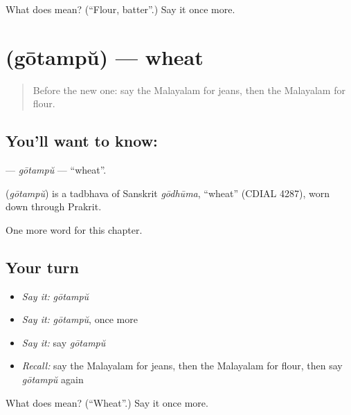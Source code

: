 \begin{tcolorbox}[breakable,colback=teal!4,colframe=teal!35!black,title={Before you move on}]
What does  mean? (\textquotedblleft{}Flour, batter\textquotedblright{}.) Say it once more.
\end{tcolorbox}
\section[\texorpdfstring{\ml{ഗോതമ്പ്} (gōtampŭ)}{ഗോതമ്പ് (gōtampŭ)}]{ (gōtampŭ) — wheat}

\label{lesson:ML-C249-gotambu}



\begin{quote}
Before the new one: say the Malayalam for jeans, then the Malayalam for flour.
\end{quote}

\subsection*{You'll want to know: }
\textbf{} — \emph{gōtampŭ} — \textquotedblleft{}wheat\textquotedblright{}.

\begin{cousinweb}
\textbf{} (\emph{gōtampŭ}) is a tadbhava of Sanskrit \emph{gōdhūma}, \textquotedblleft{}wheat\textquotedblright{} (CDIAL 4287), worn down through Prakrit.
\end{cousinweb}

\begin{grammarlens}[title={What you've built}]
One more word for this chapter.
\end{grammarlens}

\subsection*{Your turn}
\begin{itemize}
\raggedright
  \item \emph{Say it:} \emph{gōtampŭ}
  \item \emph{Say it:} \emph{gōtampŭ}, once more
  \item \emph{Say it:} say \emph{gōtampŭ}
  \item \emph{Recall:} say the Malayalam for jeans, then the Malayalam for flour, then say \emph{gōtampŭ} again
\end{itemize}

\begin{tcolorbox}[breakable,colback=teal!4,colframe=teal!35!black,title={Before you move on}]
What does  mean? (\textquotedblleft{}Wheat\textquotedblright{}.) Say it once more.
\end{tcolorbox}
